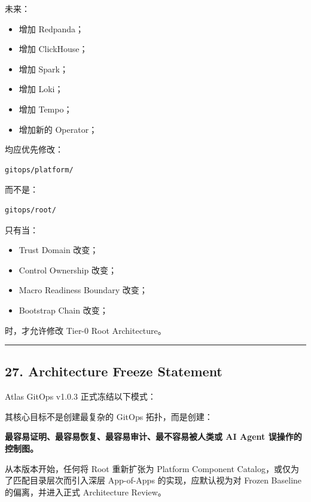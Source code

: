 \documentclass[11pt,a4paper]{article}
\begin{document}
未来：

\begin{itemize}
  \item 增加 Redpanda；
  \item 增加 ClickHouse；
  \item 增加 Spark；
  \item 增加 Loki；
  \item 增加 Tempo；
  \item 增加新的 Operator；
\end{itemize}
均应优先修改：

\begin{lstlisting}[language=text]
gitops/platform/
\end{lstlisting}
而不是：

\begin{lstlisting}[language=text]
gitops/root/
\end{lstlisting}
只有当：

\begin{itemize}
  \item Trust Domain 改变；
  \item Control Ownership 改变；
  \item Macro Readiness Boundary 改变；
  \item Bootstrap Chain 改变；
\end{itemize}
时，才允许修改 Tier-0 Root Architecture。

\vspace{0.5em}\hrule\vspace{0.5em}
\subsection{27. Architecture Freeze Statement}
Atlas GitOps v1.0.3 正式冻结以下模式：

其核心目标不是创建最复杂的 GitOps 拓扑，而是创建：

\begin{gfmBlockquote}
\textbf{最容易证明、最容易恢复、最容易审计、最不容易被人类或 AI Agent 误操作的控制图。}
\end{gfmBlockquote}
从本版本开始，任何将 Root 重新扩张为 Platform Component Catalog，或仅为了匹配目录层次而引入深层 App-of-Apps 的实现，应默认视为对 Frozen Baseline 的偏离，并进入正式 Architecture Review。
\end{document}
